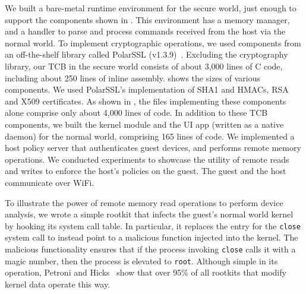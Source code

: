 We built a bare-metal runtime environment for the secure world, just enough to
support the components shown in . This environment has a
memory manager, and a handler to parse and process commands received from the
host via the normal world. To implement cryptographic operations, we used
components from an off-the-shelf library called PolarSSL
(v1.3.9)~\cite{polarssl}. Excluding the cryptography library, our TCB in the
secure world consists of about 3,000 lines of C code, including about 250 lines
of inline assembly.   shows the sizes of various components.
We used PolarSSL's implementation of SHA1 and HMACs, RSA and X509 certificates.
As shown in , the files implementing these components alone
comprise only about 4,000 lines of code. In addition to these TCB components,
we built the kernel module and the UI app (written as a native daemon) for the
normal world, comprising 165 lines of code.  We implemented a host policy
server that authenticates guest devices, and performs remote memory operations.
We conducted experiments to showcase the utility of remote reads and writes to
enforce the host's policies on the guest. The guest and the host communicate
over WiFi.
%


%
To illustrate the power of remote memory read operations to perform device
analysis, we wrote a simple rootkit that infects the guest's normal world
kernel by hooking its system call table. In particular, it replaces the entry
for the \texttt{close} system call to instead point to a malicious function
injected into the kernel. The malicious functionality ensures that if the
process invoking \texttt{close} calls it with a magic number, then the process
is elevated to \texttt{root}.  Although simple in its operation, Petroni and
Hicks~\cite{sbcfi:ccs07} show that over 95\% of all rootkits that modify kernel
data operate this way.

